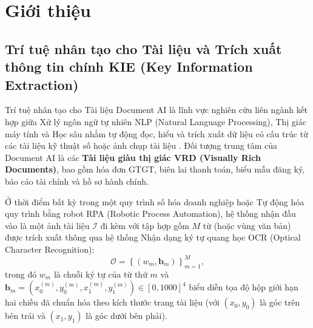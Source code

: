 \chapter{Giới thiệu}
\section{Trí tuệ nhân tạo cho Tài liệu và Trích xuất thông tin chính KIE (Key Information Extraction)}
Trí tuệ nhân tạo cho Tài liệu Document AI là lĩnh vực nghiên cứu liên ngành kết hợp giữa Xử lý ngôn ngữ tự nhiên NLP (Natural Language Processing), Thị giác máy tính và Học sâu nhằm tự động đọc, hiểu và trích xuất dữ liệu có cấu trúc từ các tài liệu kỹ thuật số hoặc ảnh chụp tài liệu \cite{cui2021document}. Đối tượng trung tâm của Document AI là các \textbf{Tài liệu giàu thị giác VRD (Visually Rich Documents)}, bao gồm hóa đơn GTGT, biên lai thanh toán, biểu mẫu đăng ký, báo cáo tài chính và hồ sơ hành chính.

Ở thời điểm bất kỳ trong một quy trình số hóa doanh nghiệp hoặc Tự động hóa quy trình bằng robot RPA (Robotic Process Automation), hệ thống nhận đầu vào là một ảnh tài liệu $\mathcal{I}$ đi kèm với tập hợp gồm $M$ từ (hoặc vùng văn bản) được trích xuất thông qua hệ thống Nhận dạng ký tự quang học OCR (Optical Character Recognition):
\begin{equation}
    \mathcal{O} = \left\{ \left(w_m, \mathbf{b}_m\right) \right\}_{m=1}^{M},
\end{equation}
trong đó $w_m$ là chuỗi ký tự của từ thứ $m$ và $\mathbf{b}_m = \left(x_0^{(m)}, y_0^{(m)}, x_1^{(m)}, y_1^{(m)}\right) \in [0, 1000]^4$ biểu diễn tọa độ hộp giới hạn hai chiều đã chuẩn hóa theo kích thước trang tài liệu (với $(x_0, y_0)$ là góc trên bên trái và $(x_1, y_1)$ là góc dưới bên phải).

